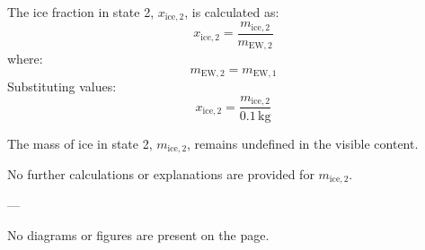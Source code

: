 The ice fraction in state 2, \( x_{\text{ice},2} \), is calculated as:  
\[
x_{\text{ice},2} = \frac{m_{\text{ice},2}}{m_{\text{EW},2}}
\]  
where:  
\[
m_{\text{EW},2} = m_{\text{EW},1}
\]  
Substituting values:  
\[
x_{\text{ice},2} = \frac{m_{\text{ice},2}}{0.1 \, \text{kg}}
\]  

The mass of ice in state 2, \( m_{\text{ice},2} \), remains undefined in the visible content.  

No further calculations or explanations are provided for \( m_{\text{ice},2} \).  

---

No diagrams or figures are present on the page.